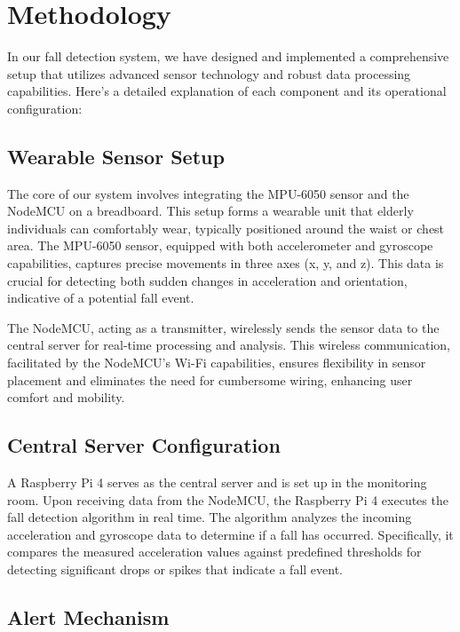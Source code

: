 \documentclass[final,5p,times,twocolumn,authoryear]{elsarticle}
\begin{document}
\section{Methodology}

In our fall detection system, we have designed and implemented a comprehensive setup that utilizes advanced sensor technology and robust data processing capabilities. Here’s a detailed explanation of each component and its operational configuration: 

\subsection{Wearable Sensor Setup}

The core of our system involves integrating the MPU-6050 sensor and the NodeMCU on a breadboard. This setup forms a wearable unit that elderly individuals can comfortably wear, typically positioned around the waist or chest area. The MPU-6050 sensor, equipped with both accelerometer and gyroscope capabilities, captures precise movements in three axes (x, y, and z). This data is crucial for detecting both sudden changes in acceleration and orientation, indicative of a potential fall event. 

The NodeMCU, acting as a transmitter, wirelessly sends the sensor data to the central server for real-time processing and analysis. This wireless communication, facilitated by the NodeMCU’s Wi-Fi capabilities, ensures flexibility in sensor placement and eliminates the need for cumbersome wiring, enhancing user comfort and mobility. 

\subsection{Central Server Configuration}

A Raspberry Pi 4 serves as the central server and is set up in the monitoring room. Upon receiving data from the NodeMCU, the Raspberry Pi 4 executes the fall detection algorithm in real time. The algorithm analyzes the incoming acceleration and gyroscope data to determine if a fall has occurred. Specifically, it compares the measured acceleration values against predefined thresholds for detecting significant drops or spikes that indicate a fall event. 

\subsection{Alert Mechanism}
\end{document}
